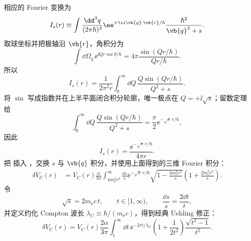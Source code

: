 \begin{derivation}[真空极化怎样修正静态势能]
相应的 Fourier 变换为
\begin{equation*}
 I_s(r)
 \equiv
 \int\frac{\dd^3 q}{(2\pi\hbar)^3}
 \ee^{+\ii\vb{q}\cdot\vb{r}/\hbar}
 \frac{\hbar^2}{\vb{q}^2+s}.
\end{equation*}
取球坐标并把极轴沿 $\vb{r}$，角积分为
\begin{equation*}
 \int\dd\Omega_q\,\ee^{\ii Qr\cos\theta/\hbar}
 =4\pi\frac{\sin(Qr/\hbar)}{Qr/\hbar}.
\end{equation*}
所以
\begin{equation*}
 I_s(r)
 =\frac1{2\pi^2r}
 \int_0^\infty\dd Q\,
 \frac{Q\sin(Qr/\hbar)}{Q^2+s}.
\end{equation*}
将 $\sin$ 写成指数并在上半平面闭合积分轮廓，唯一极点在 $Q=+\ii\sqrt s$；留数定理给
\begin{equation*}
 \int_0^\infty\dd Q\,
 \frac{Q\sin(Qr/\hbar)}{Q^2+s}
 =\frac\pi2\ee^{-\sqrt s\,r/\hbar},
\end{equation*}
因此
\begin{equation*}
 {
 I_s(r)=\frac{\ee^{-\sqrt s\,r/\hbar}}{4\pi r}.}
 \end{equation*}
把  插入 ，交换 $s$ 与 $\vb{q}$ 积分，并使用上面得到的三维 Fourier 积分：
\begin{align*}
 \delta V_U(r)
 &=V_C(r)\frac{\alpha}{3\pi}
 \int_{4m_{\mathrm e}^2c^2}^{\infty}\frac{\dd s}{s}
 \ee^{-\sqrt s\,r/\hbar}
 \sqrt{1-\frac{4m_{\mathrm e}^2c^2}{s}}
 \left(1+\frac{2m_{\mathrm e}^2c^2}{s}\right).
\end{align*}
令
\begin{equation*}
 \sqrt s=2m_{\mathrm e} c\,t,
 \qquad t\in[1,\infty),
 \qquad \frac{\dd s}{s}=\frac{2\dd t}{t},
\end{equation*}
并定义约化 Compton 波长 $\lambda_C\equiv\hbar/(m_{\mathrm e} c)$，得到经典 Uehling 修正：
\begin{equation*}
 {
 \delta V_U(r)
 =V_C(r)\frac{2\alpha}{3\pi}
 \int_1^\infty\dd t\,
 \ee^{-2rt/\lambda_C}
 \left(1+\frac1{2t^2}\right)
 \frac{\sqrt{t^2-1}}{t^2}.}
 \end{equation*}
\end{derivation}

